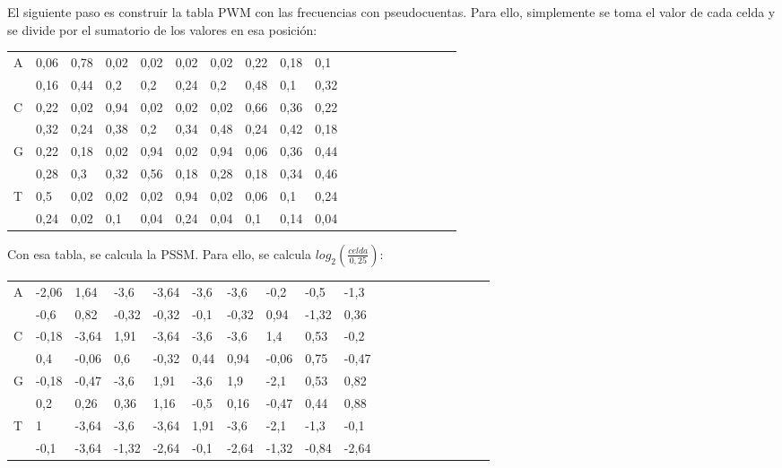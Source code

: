 El siguiente paso es construir la tabla PWM con las frecuencias con pseudocuentas. Para ello, simplemente se toma el valor de cada celda y se divide por el sumatorio de los valores en esa posición: 
\begin{table}[htbp]
\begin{tabular}{l | llllllllllllllllll}
A & 0,06 & 0,78 & 0,02 & 0,02 & 0,02 & 0,02 & 0,22 & 0,18 & 0,1  \\
& 0,16 & 0,44 & 0,2  & 0,2  & 0,24 & 0,2  & 0,48 & 0,1  & 0,32 \\
C & 0,22 & 0,02 & 0,94 & 0,02 & 0,02 & 0,02 & 0,66 & 0,36 & 0,22 \\
& 0,32 & 0,24 & 0,38 & 0,2  & 0,34 & 0,48 & 0,24 & 0,42 & 0,18 \\
G & 0,22 & 0,18 & 0,02 & 0,94 & 0,02 & 0,94 & 0,06 & 0,36 & 0,44 \\
& 0,28 & 0,3  & 0,32 & 0,56 & 0,18 & 0,28 & 0,18 & 0,34 & 0,46 \\
T & 0,5  & 0,02 & 0,02 & 0,02 & 0,94 & 0,02 & 0,06 & 0,1  & 0,24 \\
& 0,24 & 0,02 & 0,1  & 0,04 & 0,24 & 0,04 & 0,1  & 0,14 & 0,04
\end{tabular}
\end{table}

Con esa tabla, se calcula la PSSM. Para ello, se calcula $log_2(\frac{celda}{0,25})$:
\begin{table}[htbp]
\begin{tabular}{l | llllllllllllllllll}
A & -2,06 & 1,64  & -3,6 & -3,64 & -3,6 & -3,6 & -0,2 & -0,5 & -1,3 \\
& -0,6 & 0,82  & -0,32 & -0,32 & -0,1 & -0,32 & 0,94  & -1,32 & 0,36  \\
C & -0,18 & -3,64 & 1,91 & -3,64 & -3,6 & -3,6 & 1,4  & 0,53 & -0,2 \\
& 0,4  & -0,06 & 0,6   & -0,32 & 0,44 & 0,94  & -0,06 & 0,75  & -0,47 \\
G & -0,18 & -0,47 & -3,6 & 1,91  & -3,6 & 1,9  & -2,1 & 0,53 & 0,82 \\
& 0,2  & 0,26  & 0,36  & 1,16  & -0,5 & 0,16  & -0,47 & 0,44  & 0,88  \\
T & 1  & -3,64 & -3,6 & -3,64 & 1,91 & -3,6 & -2,1 & -1,3 & -0,1 \\
& -0,1 & -3,64 & -1,32 & -2,64 & -0,1 & -2,64 & -1,32 & -0,84 & -2,64
\end{tabular}
\end{table}


